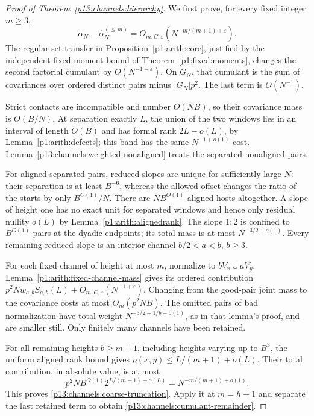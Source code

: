 \begin{proof}[Proof of Theorem~\ref{p13:channels:hierarchy}]
We first prove, for every fixed integer $m\geq3$,
\begin{equation}
 \alpha_N-\widehat\alpha_N^{(\leq m)}
       =O_{m,C,\varepsilon}(N^{-m/(m+1)+\varepsilon}).
 \label{p13:channels:coarse-truncation}
\end{equation}
The regular-set transfer in Proposition~\ref{p1:arith:core}, justified
by the independent fixed-moment bound of Theorem~\ref{p1:fixed:moments},
changes the second factorial cumulant by $O(N^{-1+\varepsilon})$.
On $G_N$, that cumulant is the sum of covariances over ordered distinct
pairs minus $|G_N|p^2$.  The last term is $O(N^{-1})$.

Strict contacts are incompatible and number $O(NB)$, so their covariance
mass is $O(B/N)$.  At separation exactly $L$, the union of the two
windows lies in an interval of length $O(B)$ and has formal rank
$2L-o(L)$, by Lemma~\ref{p1:arith:defects}; this band has the same
$N^{-1+o(1)}$ cost.  Lemma~\ref{p13:channels:weighted-nonaligned}
treats the separated nonaligned pairs.

For aligned separated pairs, reduced slopes are unique for sufficiently
large $N$: their separation is at least $B^{-6}$, whereas the allowed
offset changes the ratio of the starts by only $B^{O(1)}/N$.
There are $NB^{O(1)}$ aligned hosts altogether.  A slope of height one
has no exact unit for separated windows and hence only residual nullity
$o(L)$ by Lemma~\ref{p1:arith:alignedrank}.  The slope $1:2$ is confined
to $B^{O(1)}$ pairs at the dyadic endpoints; its total mass is at most
$N^{-3/2+o(1)}$.  Every remaining reduced slope is an interior channel
$b/2<a<b$, $b\geq3$.

For each fixed channel of height at most $m$, normalize to
$bV_x\cup aV_y$.  Lemma~\ref{p1:arith:fixed-channel-mass} gives its
ordered contribution
$p^2Nw_{a,b}S_{a,b}(L)+O_{m,C,\varepsilon}(N^{-1+\varepsilon})$.
Changing from the good-pair joint mass to the covariance costs at most
$O_m(p^2NB)$.  The omitted pairs of bad normalization have total weight
$N^{-3/2+1/b+o(1)}$, as in that lemma's proof, and are smaller still.
Only finitely many channels have been retained.

For all remaining heights $b\geq m+1$, including heights varying up to
$B^3$, the uniform aligned rank bound gives
$\rho(x,y)\leq L/(m+1)+o(L)$.  Their total contribution, in absolute
value, is at most
\[
 p^2 NB^{O(1)}2^{L/(m+1)+o(L)}
      =N^{-m/(m+1)+o(1)}.
\]
This proves \eqref{p13:channels:coarse-truncation}.  Apply it at $m=h+1$
and separate the last retained term to obtain
\eqref{p13:channels:cumulant-remainder}.


\end{proof}
